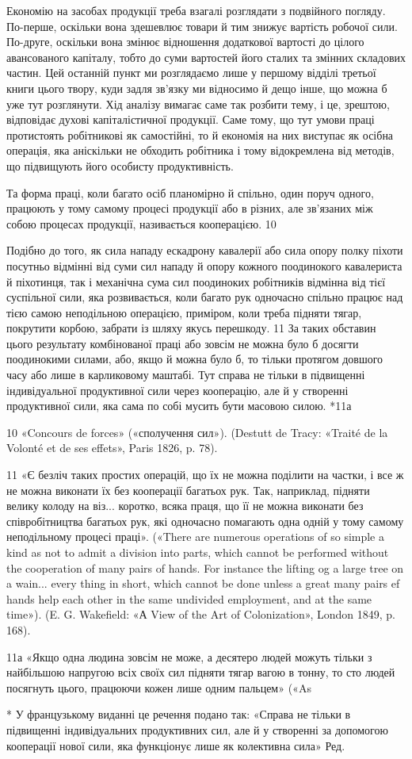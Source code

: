Економію на засобах продукції треба взагалі розглядати з
подвійного погляду. По-перше, оскільки вона здешевлює товари
й тим знижує вартість робочої сили. По-друге, оскільки вона змінює
відношення додаткової вартості до цілого авансованого капіталу,
тобто до суми вартостей його сталих та змінних складових
частин. Цей останній пункт ми розглядаємо лише у першому
відділі третьої книги цього твору, куди задля зв’язку ми відносимо
й дещо інше, що можна б уже тут розглянути. Хід аналізу
вимагає саме так розбити тему, і це, зрештою, відповідає духові
капіталістичної продукції. Саме тому, що тут умови праці протистоять
робітникові як самостійні, то й економія на них виступає
як осібна операція, яка аніскільки не обходить робітника і
тому відокремлена від методів, що підвищують його особисту продуктивність.

Та форма праці, коли багато осіб планомірно й спільно, один
поруч одного, працюють у тому самому процесі продукції або в різних,
але зв’язаних між собою процесах продукції, називається
кооперацією. 10

Подібно до того, як сила нападу ескадрону кавалерії або сила
опору полку піхоти посутньо відмінні від суми сил нападу й
опору кожного поодинокого кавалериста й піхотинця, так і механічна
сума сил поодиноких робітників відмінна від тієї суспільної
сили, яка розвивається, коли багато рук одночасно спільно працює
над тією самою неподільною операцією, приміром, коли треба
підняти тягар, покрутити корбою, забрати із шляху якусь перешкоду. 11
За таких обставин цього результату комбінованої
праці або зовсім не можна було б досягти поодинокими силами,
або, якщо й можна було б, то тільки протягом довшого часу або
лише в карликовому маштабі. Тут справа не тільки в підвищенні
індивідуальної продуктивної сили через кооперацію, але й у
створенні продуктивної сили, яка сама по собі мусить бути масовою
силою. *11а

10 «Concours de forces» («сполучення сил»). (Destutt de Tracy: «Traité
de la Volonté et de ses effets», Paris 1826, p. 78).

11 «Є безліч таких простих операцій, що їх не можна поділити на
частки, і все ж не можна виконати їх без кооперації багатьох рук. Так,
наприклад, підняти велику колоду на віз... коротко, всяка праця, що
її не можна виконати без співробітництва багатьох рук, які одночасно
помагають одна одній у тому самому неподільному процесі праці». («There
are numerous operations of so simple a kind as not to admit a division into
parts, which cannot be performed without the cooperation of many pairs
of hands. For instance the lifting og a large tree on a wain... every thing
in short, which cannot be done unless a great many pairs ef hands help each
other in the same undivided employment, and at the same time»). (E. G.
Wakefield: «А View of the Art of Colonization», London 1849, p. 168).

11а «Якщо одна людина зовсім не може, а десятеро людей можуть
тільки з найбільшою напругою всіх своїх сил підняти тягар вагою в тонну,
то сто людей посягнуть цього, працюючи кожен лише одним пальцем» («As

* У французькому виданні це речення подано так: «Справа не тільки
в підвищенні індивідуальних продуктивних сил, але й у створенні за допомогою
кооперації нової сили, яка функціонує лише як колективна
сила» Ред.
